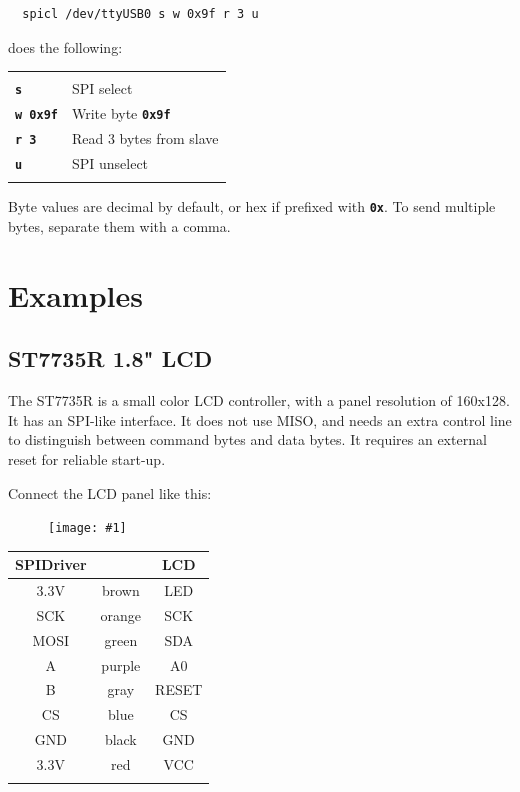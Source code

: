 \documentclass{article}
\newcommand{\pngw}[2]{
\begin{figure}[H]
\begin{center}
\texttt{[image: \#1]}
\end{center}
\end{figure}
}
\newcommand{\mach}[1]{\texttt{\textbf{#1}}}
\newcommand{\gap}{\vspace{10pt}}
\begin{document}
\begin{lstlisting}
  spicl /dev/ttyUSB0 s w 0x9f r 3 u
\end{lstlisting}

does the following:

\gap\begin{tabular}{ll}
\hline \\
 \mach{s}       & SPI select \\
 \mach{w 0x9f}  & Write byte \mach{0x9f} \\
 \mach{r 3}     & Read 3 bytes from slave \\
 \mach{u}       & SPI unselect \\
\hline \\
\end{tabular}

Byte values are decimal by default, or hex if prefixed with \mach{0x}.
To send multiple bytes, separate them with a comma.

\section{Examples}
\subsection{ST7735R 1.8" LCD}

The ST7735R is a small color LCD controller,
with a panel resolution of 160x128.
It has an SPI-like interface. It does not use MISO, and needs an
extra control line to distinguish between command bytes and data bytes.
It requires an external reset for reliable start-up.

Connect the LCD panel like this:

\pngw{img/spidriver/spidriver-lcd-1}{0.5}

\begin{center}
\gap\begin{tabular}{ccc}
\hline
SPIDriver&        & LCD     \\
\hline
3.3V     & brown  & LED     \\
SCK      & orange & SCK     \\
MOSI     & green  & SDA     \\
A        & purple & A0      \\
B        & gray   & RESET   \\
CS       & blue   & CS      \\
GND      & black  & GND     \\
3.3V     & red    & VCC     \\
\hline \\
\end{tabular}
\end{center}
\end{document}
